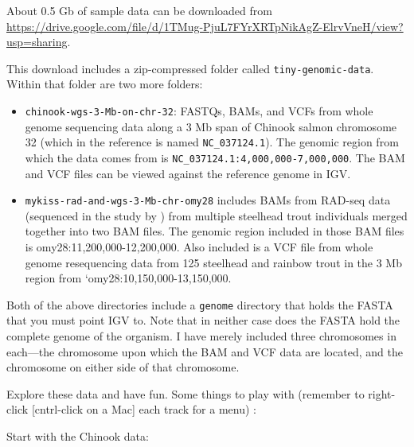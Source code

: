 \documentclass[]{krantz}
\providecommand{\tightlist}{%
  \setlength{\itemsep}{0pt}\setlength{\parskip}{0pt}}
\begin{document}
About 0.5 Gb of sample data can be downloaded from
\url{https://drive.google.com/file/d/1TMug-PjuL7FYrXRTpNikAgZ-ElrvVneH/view?usp=sharing}.

This download includes a zip-compressed folder called \texttt{tiny-genomic-data}. Within that
folder are two more folders:

\begin{itemize}
\tightlist
\item
  \texttt{chinook-wgs-3-Mb-on-chr-32}: FASTQs, BAMs, and VCFs from whole genome sequencing data
  along a 3 Mb span of Chinook salmon chromosome 32 (which in the reference is named
  \texttt{NC\_037124.1}). The genomic region from which the data comes from is
  \texttt{NC\_037124.1:4,000,000-7,000,000}.
  The BAM and VCF files can be viewed against the reference genome in IGV.
\item
  \texttt{mykiss-rad-and-wgs-3-Mb-chr-omy28} includes BAMs from RAD-seq data (sequenced
  in the study by \citep{princeEvolutionaryBasisPremature2017}) from multiple
  steelhead trout individuals
  merged together into two BAM files. The genomic region included in those
  BAM files is omy28:11,200,000-12,200,000. Also included is a VCF file from whole genome
  resequencing data from 125 steelhead and rainbow trout in the 3 Mb region from
  `omy28:10,150,000-13,150,000.
\end{itemize}

Both of the above directories include a \texttt{genome} directory that holds the FASTA
that you must point IGV to. Note that in neither case does the FASTA hold the complete
genome of the organism. I have merely included three chromosomes in each---the chromosome
upon which the BAM and VCF data are located, and the chromosome on either side of that
chromosome.

Explore these data and have fun. Some things to play with (remember to right-click
{[}cntrl-click on a Mac{]} each track for a menu) :

Start with the Chinook data:
\end{document}
